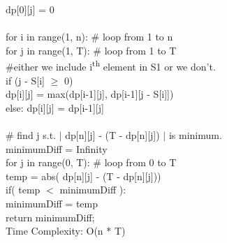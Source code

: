 \documentclass{article}
\newcommand\tab[1][4mm]{\hspace*{#1}}
\begin{document}
\tab\tab dp[0][j] = 0 \\
\vspace{0.5mm} \\
\tab for i in range(1, n): \# loop from 1 to n  \\ 
\tab\tab for j in range(1, T): \# loop from 1 to T  \\
\tab\tab\tab \#either we include i\textsuperscript{th} element in S1 or we don't. \\
\tab\tab\tab if (j - S[i] $\geq$ 0) \\
\tab\tab\tab\tab dp[i][j] = max(dp[i-1][j], dp[i-1][j - S[i]]) \\
\tab\tab\tab else: dp[i][j] = dp[i-1][j] \\
\vspace{0.5mm} \\
\tab \# find j s.t. $\mid$ dp[n][j] - (T - dp[n][j]) $\mid$ is minimum. \\
\tab minimumDiff = Infinity \\
\tab for j in range(0, T): \# loop from 0 to T \\
\tab\tab temp = abs( dp[n][j] - (T - dp[n][j])) \\
\tab\tab if( temp $<$ minimumDiff ): \\
\tab\tab\tab minimumDiff = temp \\
\tab return minimumDiff; \\
Time Complexity: O(n * T)
    
\end{document}
